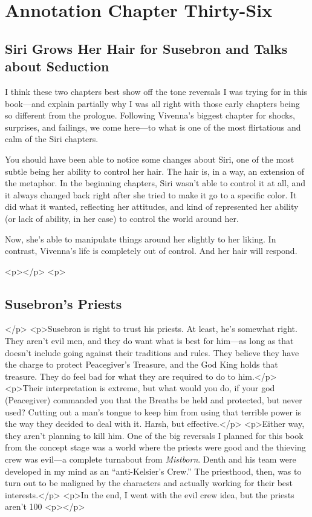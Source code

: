 \section{Annotation Chapter Thirty-Six}

\subsection*{Siri Grows Her Hair for Susebron and Talks about Seduction}

I think these two chapters best show off the tone reversals I was trying for in this book—and explain partially why I was all right with those early chapters being so different from the prologue. Following Vivenna’s biggest chapter for shocks, surprises, and failings, we come here—to what is one of the most flirtatious and calm of the Siri chapters.

You should have been able to notice some changes about Siri, one of the most subtle being her ability to control her hair. The hair is, in a way, an extension of the metaphor. In the beginning chapters, Siri wasn’t able to control it at all, and it always changed back right after she tried to make it go to a specific color. It did what it wanted, reflecting her attitudes, and kind of represented her ability (or lack of ability, in her case) to control the world around her.

Now, she’s able to manipulate things around her slightly to her liking. In contrast, Vivenna’s life is completely out of control. And her hair will respond.



<p></p>
<p>\subsection*{Susebron’s Priests}</p>
<p>Susebron is right to trust his priests. At least, he’s somewhat right. They aren’t evil men, and they do want what is best for him—as long as that doesn’t include going against their traditions and rules. They believe they have the charge to protect Peacegiver’s Treasure, and the God King holds that treasure. They do feel bad for what they are required to do to him.</p>
<p>Their interpretation is extreme, but what would you do, if your god (Peacegiver) commanded you that the Breaths be held and protected, but never used? Cutting out a man’s tongue to keep him from using that terrible power is the way they decided to deal with it. Harsh, but effective.</p>
<p>Either way, they aren’t planning to kill him. One of the big reversals I planned for this book from the concept stage was a world where the priests were good and the thieving crew was evil—a complete turnabout from \textit{Mistborn}. Denth and his team were developed in my mind as an “anti-Kelsier’s Crew.” The priesthood, then, was to turn out to be maligned by the characters and actually working for their best interests.</p>
<p>In the end, I went with the evil crew idea, but the priests aren’t 100%
<p></p>


